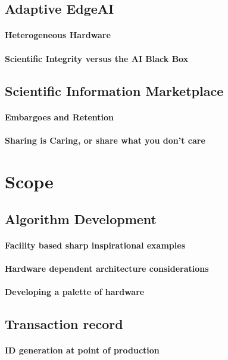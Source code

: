 \documentclass{article}
\begin{document}
\subsection{Adaptive EdgeAI}
\paragraph{Heterogeneous Hardware}
\paragraph{Scientific Integrity versus the AI Black Box}

\subsection{Scientific Information Marketplace}
\paragraph{Embargoes and Retention}
\paragraph{Sharing is Caring, or share what you don't care}

\section{Scope}

\subsection{Algorithm Development}
\paragraph{Facility based sharp inspirational examples}
\paragraph{Hardware dependent architecture considerations}
\paragraph{Developing a palette of hardware}

\subsection{Transaction record}
\paragraph{ID generation at point of production}
\end{document}
